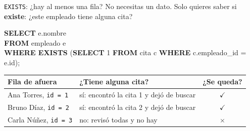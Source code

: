 \documentclass[aspectratio=169,10pt,c]{beamer}
\newcommand{\kw}[1]{\textcolor{utpRojo}{\textbf{#1}}}
\newcommand{\dentro}[1]{{\setlength{\fboxsep}{1.5pt}\colorbox{yellow!45}{#1}}}
\newcommand{\si}{$\checkmark$}
\newcommand{\no}{\textcolor{utpRojo}{$\times$}}
\newenvironment{sqlcode}[1][.86\textwidth]
  {\begin{center}\begin{lrbox}{\sqlbuf}\begin{minipage}{#1}\ttfamily\footnotesize\vspace{6pt}\raggedright}
  {\vspace{6pt}\end{minipage}\end{lrbox}\colorbox{utpGrisClaro}{\usebox{\sqlbuf}}\end{center}}
\begin{document}
\begin{frame}{\texttt{EXISTS}: ¿hay al menos una fila?}
\small No necesitas un dato. Solo quieres saber si \textbf{existe}: ¿este empleado tiene alguna cita?
\begin{sqlcode}[.76\textwidth]
\kw{SELECT} e.nombre\\
\kw{FROM} empleado e\\
\kw{WHERE EXISTS} \dentro{(\kw{SELECT} 1 \kw{FROM} cita c \kw{WHERE} c.empleado\_id = e.id)};
\end{sqlcode}
\vspace{-0.1cm}
\begin{center}
\footnotesize
\renewcommand{\arraystretch}{1.2}
\begin{tabular}{@{}llc@{}}
\toprule
\bfseries Fila de afuera & \bfseries ¿Tiene alguna cita? & \bfseries ¿Se queda? \\
\midrule
Ana Torres, \texttt{id = 1} & sí: encontró la cita 1 y dejó de buscar & \si \\
Bruno Díaz, \texttt{id = 2} & sí: encontró la cita 2 y dejó de buscar & \si \\
Carla Núñez, \texttt{id = 3} & no: revisó todas y no hay & \no \\
\bottomrule
\end{tabular}
\end{center}
\vspace{0.1cm}
\end{frame}
\end{document}
